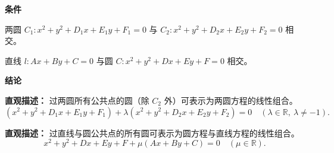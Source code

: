 \begin{statementbox}

	\textbf{\textcolor{CStatement}{条件}}
	\begin{description}[style=nextline, leftmargin=2.8em, labelsep=0.5em, itemsep=0.35em]
		\item[\textbf{\textcolor{CStatement}{条件1（两圆相交）：}}] 两圆 $C_1: x^2+y^2+D_1x+E_1y+F_1=0$ 与 $C_2: x^2+y^2+D_2x+E_2y+F_2=0$ 相交。
		\item[\textbf{\textcolor{CStatement}{条件2（直线与圆相交）：}}] 直线 $l: Ax+By+C=0$ 与圆 $C: x^2+y^2+Dx+Ey+F=0$ 相交。
	\end{description}

	\textbf{\textcolor{CStatement}{结论}}
	\begin{description}[style=nextline, leftmargin=2.8em, labelsep=0.5em, itemsep=0.45em]
		\item[\textbf{\textcolor{CStatement}{结论一（两圆交点的圆系）：}}]
			\textbf{\textcolor{CStatement}{直观描述：}}
			过两圆所有公共点的圆（除 $C_2$ 外）可表示为两圆方程的线性组合。
			\[
				(x^2+y^2+D_1x+E_1y+F_1)+\lambda(x^2+y^2+D_2x+E_2y+F_2)=0 \quad (\lambda\in\mathbb{R},\ \lambda\neq -1).
			\]

		\item[\textbf{\textcolor{CStatement}{推广结论（直线-圆系）：}}]
			\textbf{\textcolor{CStatement}{直观描述：}}
			过直线与圆公共点的所有圆可表示为圆方程与直线方程的线性组合。
			\[
				x^2+y^2+Dx+Ey+F+\mu(Ax+By+C)=0 \quad (\mu\in\mathbb{R}).
			\]
	\end{description}

\end{statementbox}
